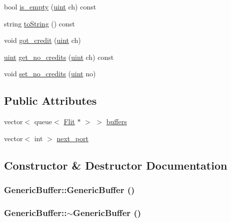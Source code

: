 \begin{CompactItemize}
\item 
bool \hyperlink{classGenericBuffer_94742936925e0b4873dd270aed2c326d}{is\_\-empty} (\hyperlink{outputBuffer_8h_91ad9478d81a7aaf2593e8d9c3d06a14}{uint} ch) const 
\item 
string \hyperlink{classGenericBuffer_3e9808bf28490fcc38ba13e7eb6ef501}{toString} () const 
\item 
void \hyperlink{classGenericBuffer_61f0e9249ca38d149372bdd74906f2a7}{got\_\-credit} (\hyperlink{outputBuffer_8h_91ad9478d81a7aaf2593e8d9c3d06a14}{uint} ch)
\item 
\hyperlink{outputBuffer_8h_91ad9478d81a7aaf2593e8d9c3d06a14}{uint} \hyperlink{classGenericBuffer_8c80e28741bae248ed61c72cc5399f2d}{get\_\-no\_\-credits} (\hyperlink{outputBuffer_8h_91ad9478d81a7aaf2593e8d9c3d06a14}{uint} ch) const 
\item 
void \hyperlink{classGenericBuffer_222b1ccd9db0a123acb9f3d34d38881c}{set\_\-no\_\-credits} (\hyperlink{outputBuffer_8h_91ad9478d81a7aaf2593e8d9c3d06a14}{uint} no)
\end{CompactItemize}
\subsection*{Public Attributes}
\begin{CompactItemize}
\item 
vector$<$ queue$<$ \hyperlink{classFlit}{Flit} $\ast$ $>$ $>$ \hyperlink{classGenericBuffer_827e77b8ad0d8fcd36c95e63b6ed8001}{buffers}
\item 
vector$<$ int $>$ \hyperlink{classGenericBuffer_10b8e8d2522ed4797fa485d6ffa41838}{next\_\-port}
\end{CompactItemize}


\subsection{Constructor \& Destructor Documentation}
\hypertarget{classGenericBuffer_4281e7a40133d057f6cfad3b715084b0}{
\subsubsection[{GenericBuffer}]{\setlength{\rightskip}{0pt plus 5cm}GenericBuffer::GenericBuffer ()}}
\label{classGenericBuffer_4281e7a40133d057f6cfad3b715084b0}


\hypertarget{classGenericBuffer_d9a4c588a03bdf24a6fe586376d17e0c}{
\subsubsection[{$\sim$GenericBuffer}]{\setlength{\rightskip}{0pt plus 5cm}GenericBuffer::$\sim$GenericBuffer ()}}
\label{classGenericBuffer_d9a4c588a03bdf24a6fe586376d17e0c}




